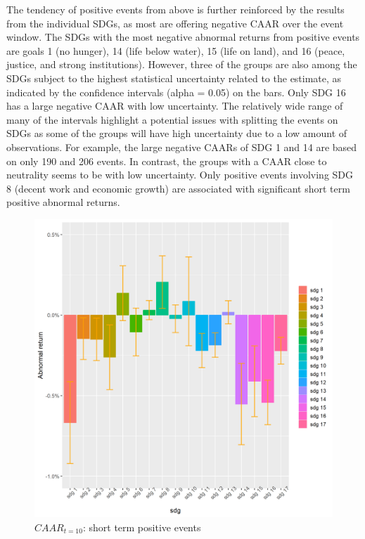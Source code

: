 The tendency of positive events from above is further reinforced by the results from the individual SDGs, as most are offering negative CAAR over the event window. The SDGs with the most negative abnormal returns from positive events are goals 1 (no hunger), 14 (life below water), 15 (life on land), and 16 (peace, justice, and strong institutions). However, three of the groups are also among the SDGs subject to the highest statistical uncertainty related to the estimate, as indicated by the confidence intervals (alpha = 0.05) on the bars. Only SDG 16 has a large negative CAAR with low uncertainty. The relatively wide range of many of the intervals highlight a potential issues with splitting the events on SDGs as some of the groups will have high uncertainty due to a low amount of observations. For example, the large negative CAARs of SDG 1 and 14 are based on only 190 and 206 events. In contrast, the groups with a CAAR close to neutrality seems to be with low uncertainty.  
Only positive events involving SDG 8 (decent work and economic growth) are associated with significant short term positive abnormal returns. 
 
\begin{figure} [H]
    \centering
    \includegraphics[scale=0.6]{Projekt/1.Figures analysis/ST_positive_sdg_bar.png}
    \caption{$CAAR_{t=10}$: short term positive events}
    \label{fig:ST_pos_bar}
\end{figure}


